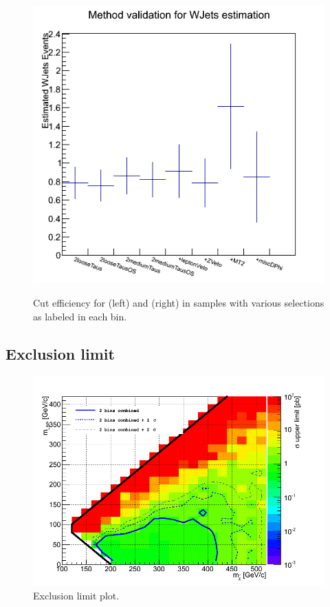 \begin{figure}[htbp]
\includegraphics[angle=0,scale=0.35]{TauTauFigs/WJetsEst_bin2_BJetVetoApplied.png} \\
\caption{Cut efficiency for \mttwo (left) and \SumMT (right) in samples with various selections as labeled in each bin.}
\label{fig:justification_SumMT}
\end{figure}
\subsection{Exclusion limit}
\begin{figure}[htbp]
\centering
\includegraphics[angle=0,scale=0.35]{TauTauFigs/diTau_exclusion.png}
\caption{Exclusion limit plot.}
\label{fig:exclusion}
\end{figure}
